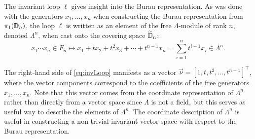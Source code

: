 The invariant loop $\ell$ gives insight into the Burau representation. As was done with the generators $x_1,\dots,x_n$ when constructing the Burau representation from $\pi_1(\mathbb{D}_n)$, the loop $\ell$ is written as an element of the free $\Lambda$-module of rank $n$, denoted $\Lambda^n$, when cast onto the covering space $\widetilde{\mathbb{D}}_n$:
\begin{equation}
    x_1\cdots x_n\in F_n\mapsto x_1+t x_2 + t^2 x_3 + \cdots + t^{n-1}x_n = \sum_{i=1}^{n}t^{i-1}x_i\in\Lambda^n.\label{eq:invLoop}
\end{equation}

The right-hand side of \cref{eq:invLoop} manifests as a vector $\vec{\nu}={\left[ 1,t,t^2,\dots,t^{n-1} \right]}^\top$, where the vector components correspond to the coefficients of the free generators $x_1,\dots,x_n$. Note that this vector comes from the coordinate representation of $\Lambda^n$ rather than directly from a vector space since $\Lambda$ is not a field, but this serves as useful way to describe the elements of $\Lambda^n$. The coordinate description of $\Lambda^n$ is useful in constructing a non-trivial invariant vector space with respect to the Burau representation.

